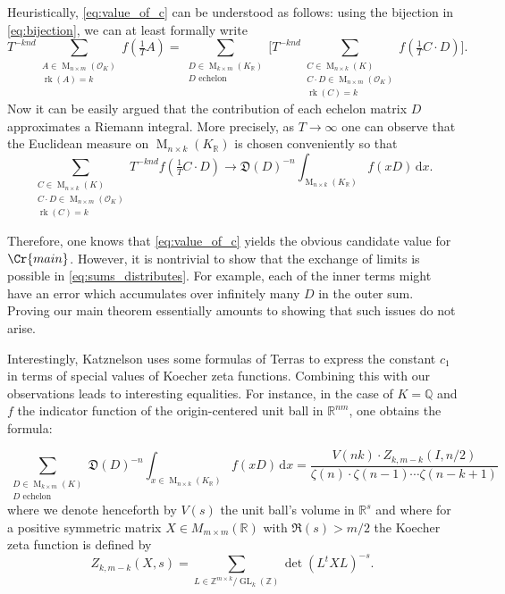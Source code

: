 \documentclass{amsart}
\theoremstyle{definition}
\theoremstyle{remark}
\newcommand{\OK}{\mathcal{O}_K}
\newcommand{\KR}{K_\mathbb{R}}
\newcommand{\diff}{\,\mathrm{d}}
\DeclareMathOperator{\M}{M}
\DeclareMathOperator{\GL}{GL}
\DeclareMathOperator{\rank}{rk}
\begin{document}
Heuristically, \cref{eq:value_of_c} can be understood as follows: using the bijection in \cref{eq:bijection}, 
we can at least formally write 
\begin{equation}
    T^{-knd}\sum_{\substack{A \in \M_{ n \times m }(\OK) \\ \rank(A) = k }} f( \tfrac{1}{T} A)  
    = \sum_{\substack{D \in \M_{k \times m}(\KR) \\ D \text{ echelon} }} \Big[ T^{-knd}\sum_{\substack{C \in \M_{n \times k}(K)  \\ C \cdot D   \in \M_{n \times m} (\OK) \\ \rank(C) = k }} f(\tfrac{1}{T} C\cdot D ) \Big].
    \label{eq:sums_distributes}
\end{equation}
Now it can be easily argued that the contribution of each echelon matrix $D$ approximates a Riemann integral. More precisely, as $T \rightarrow  \infty$ one can observe that the Euclidean measure on $\M_{n \times k}(\KR)$ is chosen conveniently so that
\begin{equation}
    \sum_{\substack{C \in \M_{n \times k}(K)  \\ C \cdot D   \in \M_{n \times m} (\OK) \\ \rank(C) = k }} 
    {T^{-knd}}
    f(\tfrac{1}{T} C\cdot D )  \rightarrow
    \mathfrak{D}(D)^{-n}
    \int_{\M_{n \times k}(\KR) } f(xD) \diff x.
\end{equation}

Therefore, one knows that \cref{eq:value_of_c} yields the obvious candidate value for $\Cr{main}$. 
However, it is nontrivial to show that the exchange of limits is possible in \cref{eq:sums_distributes}. 
For example, each of the inner terms might have an error which accumulates over infinitely many $D$ in the outer sum. 
Proving our main theorem essentially amounts to showing that such issues do not arise.


\par 
{
    Interestingly, Katznelson \cite{K1994} uses some formulas of Terras \cite{T12}
    to express the constant $c_{1}$ in terms of special values of Koecher zeta functions. Combining this with our observations leads to interesting equalities. For instance, in the case of $K=\mathbb{Q}$ and $f$ the indicator function of the origin-centered unit ball in $\mathbb{R}^{nm}$, one obtains the formula: 

    \begin{equation}
        \sum_{ \substack{ D \in \M_{k \times m}(K) \\ D \text{ echelon}} } \mathfrak{D}(D)^{-n}\int_{x \in \M_{n \times k}(\KR)} f(x D )  \diff x=\frac{V(nk)\cdot Z_{k,m-k}(I, n/2)}{\zeta(n)\cdot \zeta(n-1)\cdots \zeta(n-k+1)}
        \label{eq:correct_usage}
    \end{equation}
    where we denote henceforth by $V(s)$ the unit ball's volume in $\mathbb{R}^s$ and where for a positive symmetric matrix $X\in M_{m\times m}(\mathbb{R})$ with $\Re(s)>m/2$ the Koecher zeta function is defined by 
$$Z_{k,m-k}(X, s)=\sum_{L\in \mathbb{Z}^{m\times k}/\GL_k(\mathbb{Z})}\det(L^tXL)^{-s}. $$}
\end{document}

